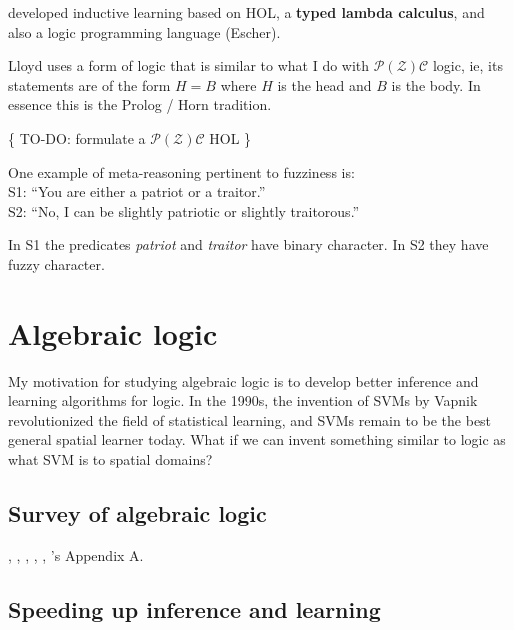 \citep*{Lloyd2003} developed inductive learning based on HOL, a \textbf{typed lambda calculus}, and also a logic programming language (Escher).

Lloyd uses a form of logic that is similar to what I do with $\mathcal{P(Z)C}$ logic, ie, its statements are of the form $H = B$ where $H$ is the head and $B$ is the body.  In essence this is the Prolog / Horn tradition.

\{ TO-DO:  formulate a $\mathcal{P(Z)C}$ HOL \}

\label{sec:PZ-meta-reasoning}

One example of meta-reasoning pertinent to fuzziness is:\\
\hspace*{1cm} S1: ``You are either a patriot or a traitor.''\\
\hspace*{1cm} S2: ``No, I can be slightly patriotic or slightly traitorous.''

In S1 the predicates \textit{patriot} and \textit{traitor} have binary character.  In S2 they have fuzzy character.

\underconst

\section{Algebraic logic}

My motivation for studying algebraic logic is to develop better inference and learning algorithms for logic.  In the 1990s, the invention of SVMs by Vapnik revolutionized the field of statistical learning, and SVMs remain to be the best general spatial learner today.  What if we can invent something similar to logic as what SVM is to spatial domains?

\subsection{Survey of algebraic logic}

\citep*{Halmos1962}, \citep*{Andreka2001}, \citep*{Halmos1988}, \citep*{Craig1974}, \citep*{Plotkin1994}, \citep*{Lawvere2003}'s Appendix A.


\subsection{Speeding up inference and learning}

